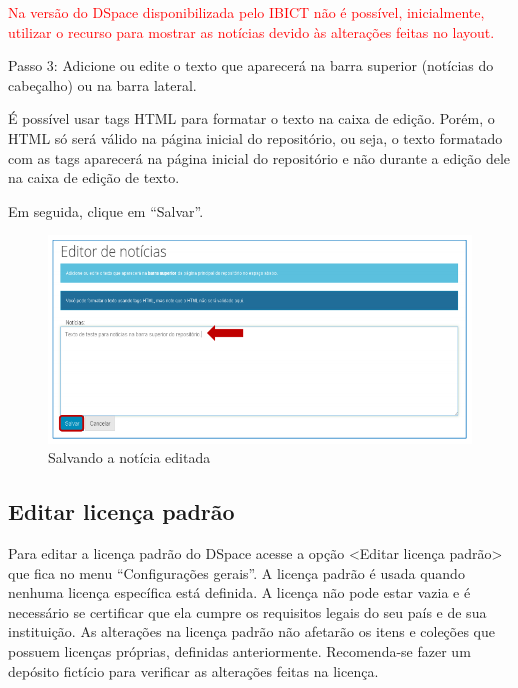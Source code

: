 \documentclass[12pt,hidelinks]{article}
\begin{document}
    \textcolor{red}{Na versão do DSpace disponibilizada pelo IBICT não é possível, inicialmente, utilizar o recurso para mostrar as notícias devido às alterações feitas no layout.}
    
    \singlespacing
    
    Passo 3: Adicione ou edite o texto que aparecerá na barra superior (notícias do cabeçalho) ou na barra lateral.
    
    \singlespacing
    
    É possível usar tags HTML para formatar o texto na caixa de edição. Porém, o HTML só será válido na página inicial do repositório, ou seja, o texto formatado com as tags aparecerá na página inicial do repositório e não durante a edição dele na caixa de edição de texto.
    
    \singlespacing
    
    Em seguida, clique em “Salvar”.
    
\newpage

    \begin{figure}[!htp]
                \centering
                \includegraphics[scale=0.8]{figura/Figura131.png}
                \caption{Salvando a notícia editada}
            \label{Rotulo}
        \end{figure}
    
    \subsection{Editar licença padrão}
    
    Para editar a licença padrão do DSpace acesse a opção <Editar licença padrão> que fica no menu “Configurações gerais”. A licença padrão é usada quando nenhuma licença específica está definida. A licença não pode estar vazia e é necessário se certificar que ela cumpre os requisitos legais do seu país e de sua instituição. As alterações na licença padrão não afetarão os itens e coleções que possuem licenças próprias, definidas anteriormente. Recomenda-se fazer um depósito fictício para verificar as alterações feitas na licença.
    
\end{document}
